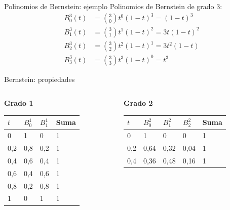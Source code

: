 \documentclass[original_version/main.tex]{subfiles}
\begin{document}
\begin{frame}[t]{Polinomios de Bernstein: ejemplo}
Polinomios de Bernstein de grado 3:\[\begin{aligned}B_0^3(t)&=\binom{3}{0}t^{0}(1-t)^{3}=(1-t)^3\\[3mm]B_1^3(t)&=\binom{3}{1}t^{1}(1-t)^{2}=3t(1-t)^2\\[3mm]B_2^3(t)&=\binom{3}{2}t^{2}(1-t)^{1}=3t^2(1-t)\\[3mm]B_3^3(t)&=\binom{3}{3}t^{3}(1-t)^{0}=t^3\end{aligned}\]
\end{frame}

\begin{frame}[t]{Bernstein: propiedades}
\begin{columns}[T]\begin{column}{.48\textwidth}\textbf{Grado 1}\begingroup\scriptsize\setlength{\tabcolsep}{2pt}\begin{center}\begin{tabular}{|C{.19\textwidth}|C{.19\textwidth}|C{.19\textwidth}|C{.19\textwidth}|}\hline
$t$ & $B_0^1$ & $B_1^1$ & Suma\\\hline
\rule[-1.5mm]{0pt}{3.7mm}0 & 1 & 0 & 1\\\hline
\rule[-1.5mm]{0pt}{3.7mm}0,2 & 0,8 & 0,2 & 1\\\hline
\rule[-1.5mm]{0pt}{3.7mm}0,4 & 0,6 & 0,4 & 1\\\hline
\rule[-1.5mm]{0pt}{3.7mm}0,6 & 0,4 & 0,6 & 1\\\hline
\rule[-1.5mm]{0pt}{3.7mm}0,8 & 0,2 & 0,8 & 1\\\hline
\rule[-1.5mm]{0pt}{3.7mm}1 & 0 & 1 & 1\\\hline
\end{tabular}\end{center}\endgroup\end{column}\begin{column}{.48\textwidth}\textbf{Grado 2}\begingroup\scriptsize\setlength{\tabcolsep}{2pt}\begin{center}\begin{tabular}{|C{.155\textwidth}|C{.155\textwidth}|C{.155\textwidth}|C{.155\textwidth}|C{.155\textwidth}|}\hline
$t$ & $B_0^2$ & $B_1^2$ & $B_2^2$ & Suma\\\hline
\rule[-1.5mm]{0pt}{3.7mm}0 & 1 & 0 & 0 & 1\\\hline
\rule[-1.5mm]{0pt}{3.7mm}0,2 & 0,64 & 0,32 & 0,04 & 1\\\hline
\rule[-1.5mm]{0pt}{3.7mm}0,4 & 0,36 & 0,48 & 0,16 & 1\\\hline

\end{tabular}
\end{center}
\end{column}
\end{columns}
\end{frame}
\end{document}
